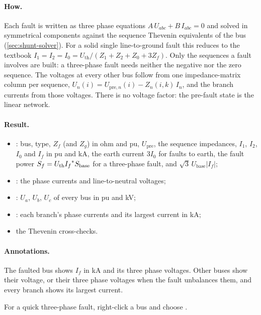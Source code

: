 \paragraph{How.} Each fault is written as three phase equations $A\,U_{abc} + B\,I_{abc} =
0$ and solved in symmetrical components against the sequence Thevenin equivalents of the
bus (\cref{sec:shunt-solver}). For a solid single line-to-ground fault this reduces to
the textbook $I_1 = I_2 = I_0 = U_\text{th}/(Z_1 + Z_2 + Z_0 + 3Z_f)$. Only the sequences
a fault involves are built: a three-phase fault needs neither the negative nor the zero
sequence. The voltages at every other bus follow from one impedance-matrix column per
sequence, $U_n(i) = U_{\text{pre},n}(i) - Z_n(i,k)\,I_n$, and the branch currents from
those voltages. There is no voltage factor: the pre-fault state is the linear network.

\paragraph{Result.}
\begin{itemize}
  \item {}: bus, type, $Z_f$ (and $Z_g$) in ohm and pu, $U_\text{pre}$, the
    sequence impedances, $I_1$, $I_2$, $I_0$ and $I_f$ in pu and kA, the earth current
    $3I_0$ for faults to earth, the fault power $S_f = U_\text{th}{I_f}^{*}S_\text{base}$
    for a three-phase fault, and $\sqrt3\,U_\text{base}|I_f|$;
  \item {}: the phase currents and line-to-neutral voltages;
  \item {}: $U_a$, $U_b$, $U_c$ of every bus in pu and kV;
  \item {}: each branch's phase currents and its
    largest current in kA;
  \item the Thevenin cross-checks.
\end{itemize}

\paragraph{Annotations.} The faulted bus shows $I_f$ in kA and its three phase voltages.
Other buses show their voltage, or their three phase voltages when the fault unbalances
them, and every branch shows its largest current.

\begin{tip}
For a quick three-phase fault, right-click a bus and choose .
\end{tip}

